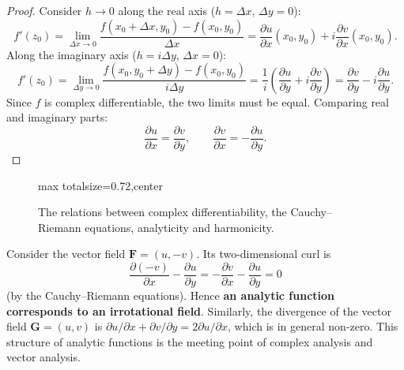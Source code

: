 \begin{proof}
Consider $h \to 0$ along the real axis ($h = \Delta x$, $\Delta y = 0$):
\[
f'(z_0) = \lim_{\Delta x \to 0} \frac{f(x_0+\Delta x, y_0) - f(x_0, y_0)}{\Delta x} = \frac{\partial u}{\partial x}(x_0,y_0) + i\frac{\partial v}{\partial x}(x_0,y_0).
\]
Along the imaginary axis ($h = i\Delta y$, $\Delta x = 0$):
\[
f'(z_0) = \lim_{\Delta y \to 0} \frac{f(x_0, y_0+\Delta y) - f(x_0, y_0)}{i\Delta y} = \frac{1}{i}\left(\frac{\partial u}{\partial y} + i\frac{\partial v}{\partial y}\right) = \frac{\partial v}{\partial y} - i\frac{\partial u}{\partial y}.
\]
Since $f$ is complex differentiable, the two limits must be equal. Comparing real and imaginary parts:
\[
\frac{\partial u}{\partial x} = \frac{\partial v}{\partial y}, \qquad \frac{\partial v}{\partial x} = -\frac{\partial u}{\partial y}.
\]
\end{proof}

\begin{figure}[htbp]
\centering
\begin{adjustbox}{max totalsize={\linewidth}{0.72\textheight},center}
\end{adjustbox}
\caption{The relations between complex differentiability, the Cauchy--Riemann equations, analyticity and harmonicity.}
\label{fig:cr_analytic_harmonic}
\end{figure}

\begin{remark}\label{rem:cr_curl_zero}
Consider the vector field $\mathbf{F} = (u, -v)$. Its two-dimensional curl is
\[
\frac{\partial(-v)}{\partial x} - \frac{\partial u}{\partial y} = -\frac{\partial v}{\partial x} - \frac{\partial u}{\partial y} = 0
\]
(by the Cauchy--Riemann equations). Hence \textbf{an analytic function corresponds to an irrotational field}. Similarly, the divergence of the vector field $\mathbf{G} = (u, v)$ is $\partial u/\partial x + \partial v/\partial y = 2\partial u/\partial x$, which is in general non-zero. This structure of analytic functions is the meeting point of complex analysis and vector analysis.
\end{remark}

